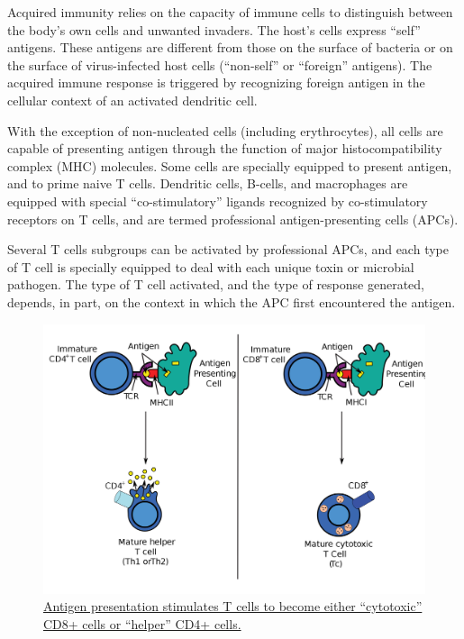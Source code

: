 Acquired immunity relies on the capacity of immune cells to distinguish between the body's own cells and unwanted invaders. The host's cells express ``self'' antigens. These antigens are different from those on the surface of bacteria or on the surface of virus-infected host cells (``non-self'' or ``foreign'' antigens). The acquired immune response is triggered by recognizing foreign antigen in the cellular context of an activated dendritic cell.

With the exception of non-nucleated cells (including erythrocytes), all cells are capable of presenting antigen through the function of major histocompatibility complex (MHC) molecules. Some cells are specially equipped to present antigen, and to prime naive T cells. Dendritic cells, B-cells, and macrophages are equipped with special ``co-stimulatory'' ligands recognized by co-stimulatory receptors on T cells, and are termed professional antigen-presenting cells (APCs).

Several T cells subgroups can be activated by professional APCs, and each type of T cell is specially equipped to deal with each unique toxin or microbial pathogen. The type of T cell activated, and the type of response generated, depends, in part, on the context in which the APC first encountered the antigen.



\begin{figure}

{\centering \includegraphics[width=0.7\linewidth]{./figures/immune/Antigen_presentation} 

}

\caption{\href{https://commons.wikimedia.org/wiki/File:Antigen_presentation.svg}{Antigen presentation stimulates T cells to become either ``cytotoxic'' CD8+ cells or ``helper'' CD4+ cells.}}\label{fig:antigenpresentation}
\end{figure}

